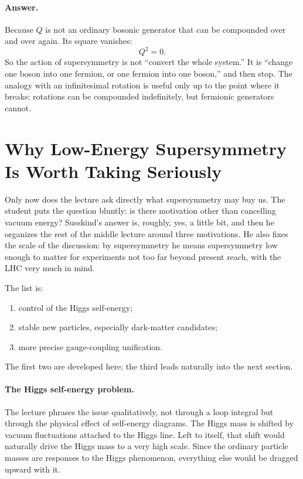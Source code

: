 \paragraph{Answer.} Because \(Q\) is not an ordinary bosonic generator that can be compounded over and over again. Its square vanishes:
\begin{equation}
Q^2=0.
\end{equation}
So the action of supersymmetry is not “convert the whole system.” It is “change one boson into one fermion, or one fermion into one boson,” and then stop. The analogy with an infinitesimal rotation is useful only up to the point where it breaks: rotations can be compounded indefinitely, but fermionic generators cannot.

\section{Why Low-Energy Supersymmetry Is Worth Taking Seriously}

Only now does the lecture ask directly what supersymmetry may buy us. The student puts the question bluntly: is there motivation other than cancelling vacuum energy? Susskind's answer is, roughly, yes, a little bit, and then he organizes the rest of the middle lecture around three motivations. He also fixes the scale of the discussion: by supersymmetry he means supersymmetry low enough to matter for experiments not too far beyond present reach, with the LHC very much in mind.

The list is:
\begin{enumerate}
\item control of the Higgs self-energy;
\item stable new particles, especially dark-matter candidates;
\item more precise gauge-coupling unification.
\end{enumerate}
The first two are developed here; the third leads naturally into the next section.

\paragraph{The Higgs self-energy problem.}
The lecture phrases the issue qualitatively, not through a loop integral but through the physical effect of self-energy diagrams. The Higgs mass is shifted by vacuum fluctuations attached to the Higgs line. Left to itself, that shift would naturally drive the Higgs mass to a very high scale. Since the ordinary particle masses are responses to the Higgs phenomenon, everything else would be dragged upward with it.

